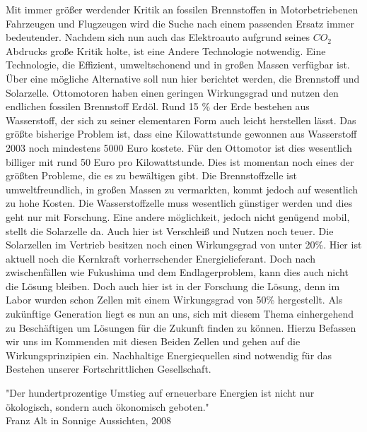 Mit immer größer werdender Kritik an fossilen Brennstoffen in Motorbetriebenen Fahrzeugen und Flugzeugen wird die Suche nach einem passenden Ersatz immer bedeutender. Nachdem sich nun auch das Elektroauto aufgrund seines $CO_2$ Abdrucks große Kritik holte, ist eine Andere Technologie notwendig. Eine Technologie, die Effizient, umweltschonend und in großen Massen verfügbar ist.
Über eine mögliche Alternative soll nun hier berichtet werden, die Brennstoff und Solarzelle.
Ottomotoren haben einen geringen Wirkungsgrad und nutzen den endlichen fossilen Brennstoff Erdöl.
Rund 15 \% der Erde bestehen aus Wasserstoff, der sich zu seiner elementaren Form auch leicht herstellen lässt.
Das größte bisherige Problem ist, dass eine Kilowattstunde gewonnen aus Wasserstoff 2003 noch mindestens 5000 Euro kostete.
Für den Ottomotor ist dies wesentlich billiger mit rund 50 Euro pro Kilowattstunde.
Dies ist momentan noch eines der größten Probleme, die es zu bewältigen gibt.
Die Brennstoffzelle ist umweltfreundlich, in großen Massen zu vermarkten, kommt jedoch auf wesentlich zu hohe Kosten.
Die Wasserstoffzelle muss wesentlich günstiger werden und dies geht nur mit Forschung.
Eine andere möglichkeit, jedoch nicht genügend mobil, stellt die Solarzelle da.
Auch hier ist Verschleiß und Nutzen noch teuer.
Die Solarzellen im Vertrieb besitzen noch einen Wirkungsgrad von unter 20\%.
Hier ist aktuell noch die Kernkraft vorherrschender Energielieferant. Doch nach zwischenfällen wie Fukushima und dem Endlagerproblem, kann dies auch nicht die Lösung bleiben.
Doch auch hier ist in der Forschung die Lösung, denn im Labor wurden schon Zellen mit einem Wirkungsgrad von 50\% hergestellt.
Als zukünftige Generation liegt es nun an uns, sich mit diesem Thema einhergehend zu Beschäftigen um Lösungen für die Zukunft finden zu können.
Hierzu Befassen wir uns im Kommenden mit diesen Beiden Zellen und gehen auf die Wirkungsprinzipien ein.
Nachhaltige Energiequellen sind notwendig für das Bestehen unserer Fortschrittlichen Gesellschaft.
\begin{center}
"Der hundertprozentige Umstieg auf erneuerbare Energien ist nicht nur ökologisch, sondern auch ökonomisch geboten."\\
Franz Alt in Sonnige Aussichten, 2008 
\end{center}
